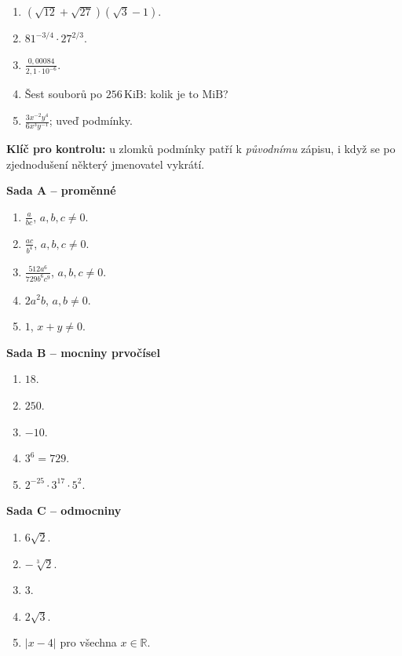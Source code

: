\documentclass[11pt,a4paper]{article}
\begin{document}
\begin{enumerate}[label=\textbf{\arabic*.},leftmargin=10mm,start=16]
\item $(\sqrt{12}+\sqrt{27})(\sqrt3-1)$.
\item $81^{-3/4}\cdot27^{2/3}$.
\item $\displaystyle\frac{0{,}00084}{2{,}1\cdot10^{-6}}$.
\item Šest souborů po $256\,\mathrm{KiB}$: kolik je to $\mathrm{MiB}$?
\item $\displaystyle\frac{3x^{-2}y^4}{6x^3y^{-1}}$; uveď podmínky.
\end{enumerate}

\newpage
{}
\textbf{Klíč pro kontrolu:} u zlomků podmínky patří k \emph{původnímu}
zápisu, i když se po zjednodušení některý jmenovatel vykrátí.

\textbf{Sada A -- proměnné}
\begin{enumerate}[label=\textbf{\arabic*.},leftmargin=10mm]
\item $\displaystyle\boxed{\frac a{bc}}$, $a,b,c\ne0$.
\item $\displaystyle\boxed{\frac{ac}{b^4}}$, $a,b,c\ne0$.
\item $\displaystyle\boxed{\frac{512a^6}{729b^6c^9}}$, $a,b,c\ne0$.
\item $\boxed{2a^2b}$, $a,b\ne0$.
\item $\boxed1$, $x+y\ne0$.
\end{enumerate}

\textbf{Sada B -- mocniny prvočísel}
\begin{enumerate}[label=\textbf{\arabic*.},leftmargin=10mm,start=6]
\item $\boxed{18}$.
\item $\boxed{250}$.
\item $\boxed{-10}$.
\item $\boxed{3^6=729}$.
\item $\boxed{2^{-25}\cdot3^{17}\cdot5^2}$.
\end{enumerate}

\textbf{Sada C -- odmocniny}
\begin{enumerate}[label=\textbf{\arabic*.},leftmargin=10mm,start=11]
\item $\boxed{6\sqrt2}$.
\item $\boxed{-\sqrt[3]2}$.
\item $\boxed3$.
\item $\boxed{2\sqrt3}$.
\item $\boxed{|x-4|}$ pro všechna $x\in\mathbb R$.
\end{enumerate}
\end{document}
